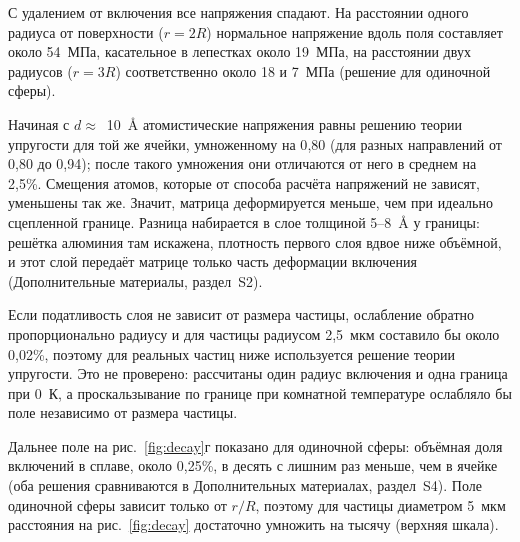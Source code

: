 \documentclass[11pt,a4paper]{article}
\begin{document}
С удалением от включения все напряжения спадают. На расстоянии одного
радиуса от поверхности ($r=2R$) нормальное напряжение вдоль поля
составляет около 54~МПа, касательное в лепестках около 19~МПа,
на расстоянии двух радиусов ($r=3R$) соответственно около 18 и 7~МПа
(решение для одиночной сферы).

Начиная с $d\approx$~10~\AA{} атомистические напряжения равны
решению теории упругости для той же ячейки, умноженному на 0{,}80
(для разных направлений от 0{,}80 до 0{,}94); после такого умножения
они отличаются от него в среднем на 2{,}5\%. Смещения атомов, которые
от способа расчёта напряжений не зависят, уменьшены так же. Значит,
матрица деформируется меньше, чем при идеально сцепленной границе.
Разница набирается в слое толщиной 5--8~\AA{} у границы: решётка алюминия
там искажена, плотность первого слоя вдвое ниже объёмной, и этот слой
передаёт матрице только часть деформации включения (Дополнительные
материалы, раздел~S2).

Если податливость слоя не зависит от размера частицы, ослабление обратно
пропорционально радиусу и для частицы радиусом 2{,}5~мкм составило бы
около 0{,}02\%, поэтому для реальных частиц ниже используется решение
теории упругости. Это не проверено: рассчитаны один радиус включения
и одна граница при 0~К, а проскальзывание по границе при комнатной
температуре ослабляло бы поле независимо от размера частицы.

Дальнее поле на рис.~\ref{fig:decay}г показано для одиночной сферы:
объёмная доля включений в сплаве, около 0{,}25\%, в десять с лишним раз
меньше, чем в ячейке (оба решения сравниваются в Дополнительных
материалах, раздел~S4). Поле одиночной сферы зависит только от $r/R$,
поэтому для частицы диаметром 5~мкм расстояния на рис.~\ref{fig:decay}
достаточно умножить на тысячу (верхняя шкала).
\end{document}
